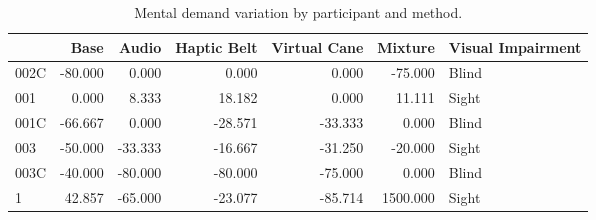 
\begin{table}[!htb]
\centering
\caption{Mental demand variation by participant and method.}
\label{tab:md_var}
\begin{tabular}{lrrrrrl}
\toprule
{} &    Base &   Audio &  Haptic Belt &  Virtual Cane &  Mixture & Visual Impairment \\
\midrule
002C & -80.000 &   0.000 &        0.000 &         0.000 &  -75.000 &             Blind \\
001  &   0.000 &   8.333 &       18.182 &         0.000 &   11.111 &             Sight \\
001C & -66.667 &   0.000 &      -28.571 &       -33.333 &    0.000 &             Blind \\
003  & -50.000 & -33.333 &      -16.667 &       -31.250 &  -20.000 &             Sight \\
003C & -40.000 & -80.000 &      -80.000 &       -75.000 &    0.000 &             Blind \\
1    &  42.857 & -65.000 &      -23.077 &       -85.714 & 1500.000 &             Sight \\
\bottomrule
\end{tabular}
\end{table}

